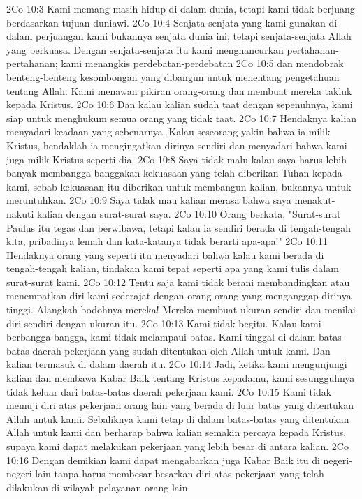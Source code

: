 2Co 10:3  Kami memang masih hidup di dalam dunia, tetapi kami tidak berjuang berdasarkan tujuan duniawi.
2Co 10:4  Senjata-senjata yang kami gunakan di dalam perjuangan kami bukannya senjata dunia ini, tetapi senjata-senjata Allah yang berkuasa. Dengan senjata-senjata itu kami menghancurkan pertahanan-pertahanan; kami menangkis perdebatan-perdebatan
2Co 10:5  dan mendobrak benteng-benteng kesombongan yang dibangun untuk menentang pengetahuan tentang Allah. Kami menawan pikiran orang-orang dan membuat mereka takluk kepada Kristus.
2Co 10:6  Dan kalau kalian sudah taat dengan sepenuhnya, kami siap untuk menghukum semua orang yang tidak taat.
2Co 10:7  Hendaknya kalian menyadari keadaan yang sebenarnya. Kalau seseorang yakin bahwa ia milik Kristus, hendaklah ia mengingatkan dirinya sendiri dan menyadari bahwa kami juga milik Kristus seperti dia.
2Co 10:8  Saya tidak malu kalau saya harus lebih banyak membangga-banggakan kekuasaan yang telah diberikan Tuhan kepada kami, sebab kekuasaan itu diberikan untuk membangun kalian, bukannya untuk meruntuhkan.
2Co 10:9  Saya tidak mau kalian merasa bahwa saya menakut-nakuti kalian dengan surat-surat saya.
2Co 10:10  Orang berkata, "Surat-surat Paulus itu tegas dan berwibawa, tetapi kalau ia sendiri berada di tengah-tengah kita, pribadinya lemah dan kata-katanya tidak berarti apa-apa!"
2Co 10:11  Hendaknya orang yang seperti itu menyadari bahwa kalau kami berada di tengah-tengah kalian, tindakan kami tepat seperti apa yang kami tulis dalam surat-surat kami.
2Co 10:12  Tentu saja kami tidak berani membandingkan atau menempatkan diri kami sederajat dengan orang-orang yang menganggap dirinya tinggi. Alangkah bodohnya mereka! Mereka membuat ukuran sendiri dan menilai diri sendiri dengan ukuran itu.
2Co 10:13  Kami tidak begitu. Kalau kami berbangga-bangga, kami tidak melampaui batas. Kami tinggal di dalam batas-batas daerah pekerjaan yang sudah ditentukan oleh Allah untuk kami. Dan kalian termasuk di dalam daerah itu.
2Co 10:14  Jadi, ketika kami mengunjungi kalian dan membawa Kabar Baik tentang Kristus kepadamu, kami sesungguhnya tidak keluar dari batas-batas daerah pekerjaan kami.
2Co 10:15  Kami tidak memuji diri atas pekerjaan orang lain yang berada di luar batas yang ditentukan Allah untuk kami. Sebaliknya kami tetap di dalam batas-batas yang ditentukan Allah untuk kami dan berharap bahwa kalian semakin percaya kepada Kristus, supaya kami dapat melakukan pekerjaan yang lebih besar di antara kalian.
2Co 10:16  Dengan demikian kami dapat mengabarkan juga Kabar Baik itu di negeri-negeri lain tanpa harus membesar-besarkan diri atas pekerjaan yang telah dilakukan di wilayah pelayanan orang lain.
